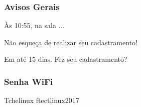 \begin{frame}
    \frametitle{Avisos Gerais}
    \begin{description}[labelwidth=\widthof{\bfseries Cadastramento}]
        \item[\textit{Coffe-Break}] Às 10:55, na sala ...
        \item[Cadastramento] Não esqueça de realizar seu cadastramento!
        \item[Certificados] Em até 15 dias. Fez seu cadastramento?
    \end{description}
\end{frame}

\begin{frame}
    \frametitle{Senha WiFi}
\begin{center}
\Huge
\vfill
Tchelinux
\vfill
ftectlinux2017
\vfill
\end{center}
\end{frame}




